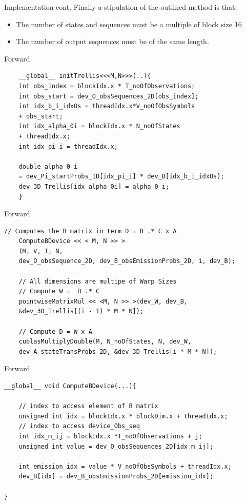 \documentclass[11pt]{beamer}
\begin{document}
\begin{frame}{Implementation cont.}
Finally a stipulation of the outlined method is that:

\begin{itemize}
\item The number of states and sequences must be a multiple of block size 16
\item The number of output sequences must be of the same length.
\end{itemize}
\end{frame}

\begin{frame}[fragile]{Forward}
\begin{verbatim}
	__global__ initTrellis<<<M,N>>>(..){
	int obs_index = blockIdx.x * T_noOfObservations;
	int obs_start = dev_O_obsSequences_2D[obs_index];
	int idx_b_i_idxOs = threadIdx.x*V_noOfObsSymbols 
	+ obs_start;
	int idx_alpha_0i = blockIdx.x * N_noOfStates 
	+ threadIdx.x;
	int idx_pi_i = threadIdx.x;

	double alpha_0_i 
	= dev_Pi_startProbs_1D[idx_pi_i] * dev_B[idx_b_i_idxOs];
	dev_3D_Trellis[idx_alpha_0i] = alpha_0_i;
	}

\end{verbatim}
\end{frame}

\begin{frame}[fragile]{Forward}
\begin{verbatim}
// Computes the B matrix in term D = B .* C x A
	ComputeBDevice << < M, N >> >
	(M, V, T, N, 
	dev_O_obsSequence_2D, dev_B_obsEmissionProbs_2D, i, dev_B);

	// All dimensions are multipe of Warp Sizes
	// Compute W =  B .* C
	pointwiseMatrixMul << <M, N >> >(dev_W, dev_B,
	&dev_3D_Trellis[(i - 1) * M * N]);

	// Compute D = W x A
	cublasMultiplyDouble(M, N_noOfStates, N, dev_W, 
	dev_A_stateTransProbs_2D, &dev_3D_Trellis[i * M * N]);
\end{verbatim}
\end{frame}

\begin{frame}[fragile]{Forward}
\begin{verbatim}
__global__ void ComputeBDevice(...){
	
	// index to access element of B matrix
	unsigned int idx = blockIdx.x * blockDim.x + threadIdx.x;
	// index to access device_Obs_seq
	int idx_m_ij = blockIdx.x *T_noOfObservations + j;
	unsigned int value = dev_O_obsSequences_2D[idx_m_ij];

	int emission_idx = value * V_noOfObsSymbols + threadIdx.x;
	dev_B[idx] = dev_B_obsEmissionProbs_2D[emission_idx];

}
\end{verbatim}
\end{frame}
\end{document}
